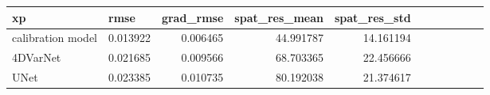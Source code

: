 \begin{tabular}{llrrrrrrrrr}
\toprule
{}            xp &       rmse &   grad\_rmse &   spat\_res\_mean &  spat\_res\_std &  \\
\midrule
     calibration model &     0.013922 &    0.006465 &          44.991787 &     14.161194 &         \\
     4DVarNet &       0.021685 &          0.009566 &                   68.703365 &          22.456666 \\
	UNet       &  0.023385 &   0.010735 &      80.192038 &     21.374617 \\
\bottomrule
\end{tabular}
